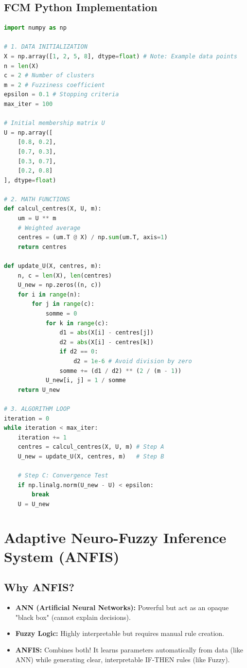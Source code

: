 \documentclass[11pt,a4paper]{article}
\begin{document}
\subsection{FCM Python Implementation}
\begin{lstlisting}[language=Python, caption=Fuzzy C-Means Algorithm Implementation]
import numpy as np

# 1. DATA INITIALIZATION
X = np.array([1, 2, 5, 8], dtype=float) # Note: Example data points
n = len(X)
c = 2 # Number of clusters
m = 2 # Fuzziness coefficient
epsilon = 0.1 # Stopping criteria
max_iter = 100 

# Initial membership matrix U
U = np.array([
    [0.8, 0.2],
    [0.7, 0.3],
    [0.3, 0.7],
    [0.2, 0.8]
], dtype=float)

# 2. MATH FUNCTIONS
def calcul_centres(X, U, m):
    um = U ** m
    # Weighted average
    centres = (um.T @ X) / np.sum(um.T, axis=1) 
    return centres

def update_U(X, centres, m):
    n, c = len(X), len(centres)
    U_new = np.zeros((n, c))
    for i in range(n):
        for j in range(c):
            somme = 0
            for k in range(c):
                d1 = abs(X[i] - centres[j])
                d2 = abs(X[i] - centres[k])
                if d2 == 0:
                    d2 = 1e-6 # Avoid division by zero
                somme += (d1 / d2) ** (2 / (m - 1))
            U_new[i, j] = 1 / somme
    return U_new

# 3. ALGORITHM LOOP
iteration = 0
while iteration < max_iter:
    iteration += 1
    centres = calcul_centres(X, U, m) # Step A
    U_new = update_U(X, centres, m)   # Step B
    
    # Step C: Convergence Test
    if np.linalg.norm(U_new - U) < epsilon:
        break
    U = U_new
\end{lstlisting}

\newpage
\section{Adaptive Neuro-Fuzzy Inference System (ANFIS)}

\subsection{Why ANFIS?}
\begin{itemize}
    \item \textbf{ANN (Artificial Neural Networks):} Powerful but act as an opaque "black box" (cannot explain decisions).
    \item \textbf{Fuzzy Logic:} Highly interpretable but requires manual rule creation.
    \item \textbf{ANFIS:} Combines both! It learns parameters automatically from data (like ANN) while generating clear, interpretable IF-THEN rules (like Fuzzy).
\end{itemize}
\end{document}
